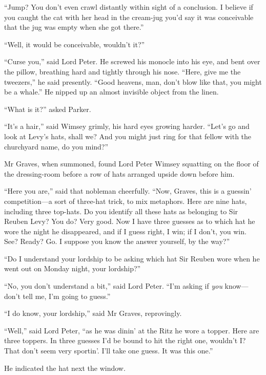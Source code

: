 \enquote{Jump? You don’t even crawl distantly within sight of a conclusion. I believe if you caught the cat with her head in the cream-jug you’d say it was conceivable that the jug was empty when she got there.}

\enquote{Well, it would be conceivable, wouldn’t it?}

\enquote{Curse you,} said Lord Peter. He screwed his monocle into his eye, and bent over the pillow, breathing hard and tightly through his nose. \enquote{Here, give me the tweezers,} he said presently. \enquote{Good heavens, man, don’t blow like that, you might be a whale.} He nipped up an almost invisible object from the linen.

\enquote{What is it?} asked Parker.

\enquote{It’s a hair,} said Wimsey grimly, his hard eyes growing harder. \enquote{Let’s go and look at Levy’s hats, shall we? And you might just ring for that fellow with the churchyard name, do you mind?}

Mr Graves, when summoned, found Lord Peter Wimsey squatting on the floor of the dressing-room before a row of hats arranged upside down before him.

\enquote{Here you are,} said that nobleman cheerfully. \enquote{Now, Graves, this is a guessin’ competition\allowbreak---\allowbreak a sort of three-hat trick, to mix metaphors. Here are nine hats, including three top-hats. Do you identify all these hats as belonging to Sir Reuben Levy? You do? Very good. Now I have three guesses as to which hat he wore the night he disappeared, and if I guess right, I win; if I don’t, you win. See? Ready? Go. I suppose you know the answer yourself, by the way?}

\enquote{Do I understand your lordship to be asking which hat Sir Reuben wore when he went out on Monday night, your lordship?}

\enquote{No, you don’t understand a bit,} said Lord Peter. \enquote{I’m asking if \textit{you} know\allowbreak---\allowbreak don’t tell me, I’m going to guess.}

\enquote{I do know, your lordship,} said Mr Graves, reprovingly.

\enquote{Well,} said Lord Peter, \enquote{as he was dinin’ at the Ritz he wore a topper. Here are three toppers. In three guesses I’d be bound to hit the right one, wouldn’t I? That don’t seem very sportin’. I’ll take one guess. It was this one.}

He indicated the hat next the window.

